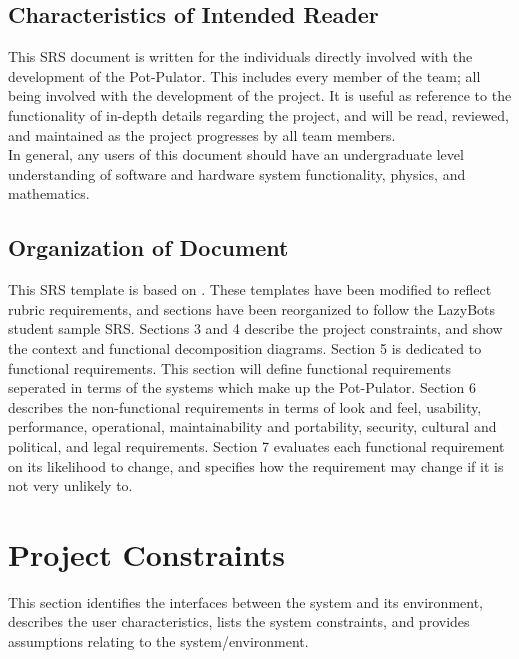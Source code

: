 \documentclass[12pt]{article}
\begin{document}
\subsection{Characteristics of Intended Reader} \label{sec_IntendedReader}

This SRS document is written for the individuals directly involved with the development of the Pot-Pulator. This includes every member of the team; all being involved with the development of the project. It is useful as reference to the functionality of in-depth details regarding the project, and will be read, reviewed, and maintained as the project progresses by all team members. \\

\noindent In general, any users of this document should have an undergraduate level understanding of software and hardware system functionality, physics, and mathematics. \\

\subsection{Organization of Document}

This SRS template is based on \citet{SmithAndLai2005, SmithEtAl2007}. These templates have been modified to reflect rubric requirements, and sections have been reorganized to follow 
the LazyBots student sample SRS. Sections 3 and 4 describe the project constraints, and show the context and functional decomposition diagrams. 
Section 5 is dedicated to functional requirements. This section will define functional requirements seperated in terms of the systems which make up the Pot-Pulator. 
Section 6 describes the non-functional requirements in terms of look and feel, usability, performance, operational, maintainability and portability, security, cultural and political, 
and legal requirements. Section 7 evaluates each functional requirement on its likelihood to change, and specifies how the requirement may change if it is not very unlikely to.


\section{Project Constraints}

This section identifies the
interfaces between the system and its environment, describes the user
characteristics, lists the system constraints, and provides assumptions relating to the system/environment.
\end{document}
